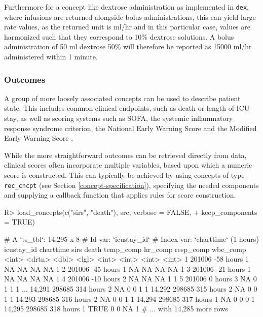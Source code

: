 \documentclass[
  notitle,
  nojss,
  noheadings]{jss}
\begin{document}
Furthermore for a concept like dextrose administration as implemented in
\texttt{dex}, where infusions are returned alongside bolus
administrations, this can yield large rate values, as the returned unit
is ml/hr and in this particular case, values are harmonized such that
they correspond to 10\% dextrose solutions. A bolus administration of 50
ml dextrose 50\% will therefore be reported as 15000 ml/hr administered
within 1 minute.

\hypertarget{outcomes}{%
\subsubsection{Outcomes}\label{outcomes}}

A group of more loosely associated concepts can be used to describe
patient state. This includes common clinical endpoints, such as death or
length of ICU stay, as well as scoring systems such as SOFA, the
systemic inflammatory response syndrome \citep[SIRS;][]{bone1992}
criterion, the National Early Warning Score \citep[NEWS;][]{jones2012}
and the Modified Early Warning Score \citep[MEWS;][]{subbe2001}.

While the more straightforward outcomes can be retrieved directly from
data, clinical scores often incorporate multiple variables, based upon
which a numeric score is constructed. This can typically be achieved by
using concepts of type \texttt{rec\_cncpt} (see Section
\ref{concept-specification}), specifying the needed components and
supplying a callback function that applies rules for score construction.

\begin{CodeChunk}
\begin{CodeInput}
R> load_concepts(c("sirs", "death"), src, verbose = FALSE,
+               keep_components = TRUE)
\end{CodeInput}
\begin{CodeOutput}
# A `ts_tbl`: 14,295 x 8
# Id var:     `icustay_id`
# Index var:  `charttime` (1 hours)
       icustay_id charttime  sirs death temp_comp hr_comp resp_comp wbc_comp
            <int> <drtn>    <dbl> <lgl>     <int>   <int>     <int>    <int>
     1     201006 -58 hours     1 NA           NA      NA        NA        1
     2     201006 -45 hours     1 NA           NA      NA        NA        1
     3     201006 -21 hours     1 NA           NA      NA        NA        1
     4     201006 -10 hours     2 NA           NA      NA         1        1
     5     201006   0 hours     3 NA            0       1         1        1
   ...
14,291     298685 314 hours     2 NA            0       0         1        1
14,292     298685 315 hours     2 NA            0       0         1        1
14,293     298685 316 hours     2 NA            0       0         1        1
14,294     298685 317 hours     1 NA            0       0         0        1
14,295     298685 318 hours     1 TRUE          0       0        NA        1
# ... with 14,285 more rows
\end{CodeOutput}
\end{CodeChunk}
\end{document}
